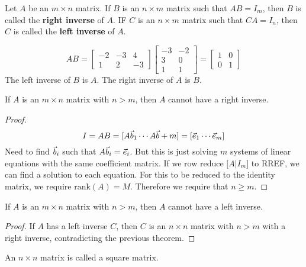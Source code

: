 \documentclass[english, 12pt]{article}
\begin{document}
\begin{defn}
Let $A$ be an $m \times n$ matrix. If $B$ is an $n \times m$ matrix such that $AB = I_m$, then $B$ is called the \textbf{right inverse} of $A$. IF $C$ is an $n \times m$ matrix such that $CA = I_n$, then $C$ is called the \textbf{left inverse} of $A$.
\end{defn}

\begin{exmp}
\[AB = \begin{bmatrix} -2 & -3 & 4 \\ 1 & 2 & -3 \end{bmatrix} \begin{bmatrix} -3 & -2 \\ 3 & 0 \\ 1 & 1 \end{bmatrix} = \begin{bmatrix} 1 & 0 \\ 0 & 1 \end{bmatrix}\]
The left inverse of $B$ is $A$. The right inverse of $A$ is $B$.
\end{exmp}

\begin{thrm}
If $A$ is an $m \times n$ matrix with $n > m$, then $A$ cannot have a right inverse.
\begin{proof}
\[ I = AB = \lbrack A\vec{b}_1 \cdots A\vec{b}+m \rbrack = \lbrack \vec{e}_1 \cdots \vec{e}_m \rbrack\]
Need to find $\vec{b}_i$ such that $A\vec{b}_i = \vec{e}_i$. But this is just solving $m$ systems of linear equations with the same coefficient matrix. If we row reduce $\lbrack A | I_m \rbrack$ to RREF, we can find a solution to each equation. For this to be reduced to the identity matrix, we require $\text{rank}(A) = M$. Therefore we require that $n \geq m$.
\end{proof}
\end{thrm}

\begin{thrm}
If $A$ is an $m \times n$ matrix with $n > m$, then $A$ cannot have a left inverse.
\begin{proof}
If $A$ has a left inverse $C$, then $C$ is an $n \times n$ matrix with $n > m$ with a right inverse, contradicting the previous theorem.
\end{proof}
\end{thrm}

\begin{defn}
An $n \times n$ matrix is called a square matrix.
\end{defn}
\end{document}
